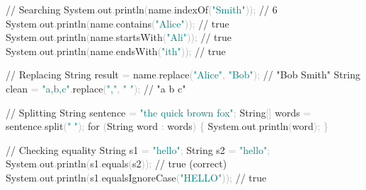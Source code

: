 \documentclass[
  justified,
  openright,
]{tufte-book}
\newcommand{\BuiltInTok}[1]{#1}
\newcommand{\CommentTok}[1]{\textcolor{MidGray}{#1}}
\newcommand{\ControlFlowTok}[1]{\textcolor{BrandBlue}{#1}}
\newcommand{\FunctionTok}[1]{\textcolor{BrandBlue}{#1}}
\newcommand{\NormalTok}[1]{#1}
\newcommand{\OperatorTok}[1]{\textcolor{DarkGray}{#1}}
\newcommand{\StringTok}[1]{\textcolor{Teal}{#1}}
\newenvironment{Shaded}{%
  \begin{snugshade}
}{%
  \end{snugshade}
}
\begin{document}
\begin{Shaded}
\begin{Highlighting}[]
\CommentTok{// Searching}
\BuiltInTok{System}\OperatorTok{.}\FunctionTok{out}\OperatorTok{.}\FunctionTok{println}\OperatorTok{(}\NormalTok{name}\OperatorTok{.}\FunctionTok{indexOf}\OperatorTok{(}\StringTok{"Smith"}\OperatorTok{));}   \CommentTok{// 6}
\BuiltInTok{System}\OperatorTok{.}\FunctionTok{out}\OperatorTok{.}\FunctionTok{println}\OperatorTok{(}\NormalTok{name}\OperatorTok{.}\FunctionTok{contains}\OperatorTok{(}\StringTok{"Alice"}\OperatorTok{));}  \CommentTok{// true}
\BuiltInTok{System}\OperatorTok{.}\FunctionTok{out}\OperatorTok{.}\FunctionTok{println}\OperatorTok{(}\NormalTok{name}\OperatorTok{.}\FunctionTok{startsWith}\OperatorTok{(}\StringTok{"Ali"}\OperatorTok{));}  \CommentTok{// true}
\BuiltInTok{System}\OperatorTok{.}\FunctionTok{out}\OperatorTok{.}\FunctionTok{println}\OperatorTok{(}\NormalTok{name}\OperatorTok{.}\FunctionTok{endsWith}\OperatorTok{(}\StringTok{"ith"}\OperatorTok{));}    \CommentTok{// true}

\CommentTok{// Replacing}
\BuiltInTok{String}\NormalTok{ result }\OperatorTok{=}\NormalTok{ name}\OperatorTok{.}\FunctionTok{replace}\OperatorTok{(}\StringTok{"Alice"}\OperatorTok{,} \StringTok{"Bob"}\OperatorTok{);}   \CommentTok{// "Bob Smith"}
\BuiltInTok{String}\NormalTok{ clean }\OperatorTok{=} \StringTok{"a,b,c"}\OperatorTok{.}\FunctionTok{replace}\OperatorTok{(}\StringTok{","}\OperatorTok{,} \StringTok{" "}\OperatorTok{);}       \CommentTok{// "a b c"}

\CommentTok{// Splitting}
\BuiltInTok{String}\NormalTok{ sentence }\OperatorTok{=} \StringTok{"the quick brown fox"}\OperatorTok{;}
\BuiltInTok{String}\OperatorTok{[]}\NormalTok{ words }\OperatorTok{=}\NormalTok{ sentence}\OperatorTok{.}\FunctionTok{split}\OperatorTok{(}\StringTok{" "}\OperatorTok{);}
\ControlFlowTok{for} \OperatorTok{(}\BuiltInTok{String}\NormalTok{ word }\OperatorTok{:}\NormalTok{ words}\OperatorTok{)} \OperatorTok{\{}
    \BuiltInTok{System}\OperatorTok{.}\FunctionTok{out}\OperatorTok{.}\FunctionTok{println}\OperatorTok{(}\NormalTok{word}\OperatorTok{);}
\OperatorTok{\}}

\CommentTok{// Checking equality}
\BuiltInTok{String}\NormalTok{ s1 }\OperatorTok{=} \StringTok{"hello"}\OperatorTok{;}
\BuiltInTok{String}\NormalTok{ s2 }\OperatorTok{=} \StringTok{"hello"}\OperatorTok{;}
\BuiltInTok{System}\OperatorTok{.}\FunctionTok{out}\OperatorTok{.}\FunctionTok{println}\OperatorTok{(}\NormalTok{s1}\OperatorTok{.}\FunctionTok{equals}\OperatorTok{(}\NormalTok{s2}\OperatorTok{));}           \CommentTok{// true (correct)}
\BuiltInTok{System}\OperatorTok{.}\FunctionTok{out}\OperatorTok{.}\FunctionTok{println}\OperatorTok{(}\NormalTok{s1}\OperatorTok{.}\FunctionTok{equalsIgnoreCase}\OperatorTok{(}\StringTok{"HELLO"}\OperatorTok{));} \CommentTok{// true}


\end{Highlighting}
\end{Shaded}
\end{document}
